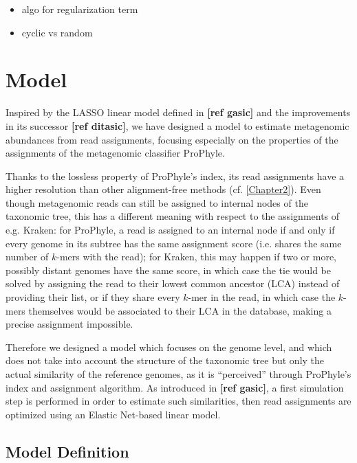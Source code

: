 \begin{itemize}
    \item algo for regularization term
    \item cyclic vs random
\end{itemize}

\section{Model}

Inspired by the LASSO linear model defined in \textbf{[ref gasic]} and the improvements in its successor \textbf{[ref ditasic]}, we have designed a model to estimate metagenomic abundances from read assignments, focusing especially on the properties of the assignments of the metagenomic classifier ProPhyle.

Thanks to the lossless property of ProPhyle's index, its read assignments have a higher resolution than other alignment-free methods (cf. \ref{Chapter2}). Even though metagenomic reads can still be assigned to internal nodes of the taxonomic tree, this has a different meaning with respect to the assignments of e.g. Kraken: for ProPhyle, a read is assigned to an internal node if and only if every genome in its subtree has the same assignment score (i.e. shares the same number of $k$-mers with the read); for Kraken, this may happen if two or more, possibly distant genomes have the same score, in which case the tie would be solved by assigning the read to their lowest common ancestor (LCA) instead of providing their list, or if they share every $k$-mer in the read, in which case the $k$-mers themselves would be associated to their LCA in the database, making a precise assignment impossible.

Therefore we designed a model which focuses on the genome level, and which does not take into account the structure of the taxonomic tree but only the actual similarity of the reference genomes, as it is ``perceived'' through ProPhyle's index and assignment algorithm. As introduced in \textbf{[ref gasic]}, a first simulation step is performed in order to estimate such similarities, then read assignments are optimized using an Elastic Net-based linear model.

\subsection{Model Definition}

